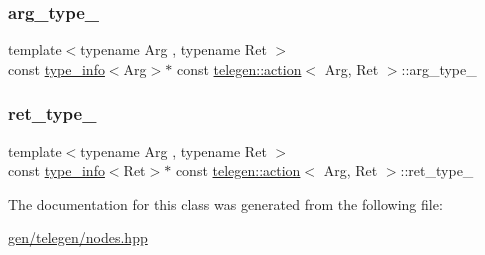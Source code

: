\subsubsection{\texorpdfstring{arg\+\_\+type\+\_\+}{arg\_type\_}}
{\footnotesize\ttfamily template$<$typename Arg , typename Ret $>$ \\
const \hyperlink{structtelegen_1_1type__info}{type\+\_\+info}$<$Arg$>$$\ast$ const \hyperlink{classtelegen_1_1action}{telegen\+::action}$<$ Arg, Ret $>$\+::arg\+\_\+type\+\_\+\hspace{0.3cm}{\ttfamily [protected]}}

\mbox{\label{classtelegen_1_1action_a1e2cfbe4fec7d4c392be9d7e3d2390dc}} 
\subsubsection{\texorpdfstring{ret\+\_\+type\+\_\+}{ret\_type\_}}
{\footnotesize\ttfamily template$<$typename Arg , typename Ret $>$ \\
const \hyperlink{structtelegen_1_1type__info}{type\+\_\+info}$<$Ret$>$$\ast$ const \hyperlink{classtelegen_1_1action}{telegen\+::action}$<$ Arg, Ret $>$\+::ret\+\_\+type\+\_\+\hspace{0.3cm}{\ttfamily [protected]}}



The documentation for this class was generated from the following file\+:\begin{DoxyCompactItemize}
\item 
\hyperlink{gen_2telegen_2nodes_8hpp}{gen/telegen/nodes.\+hpp}\end{DoxyCompactItemize}
